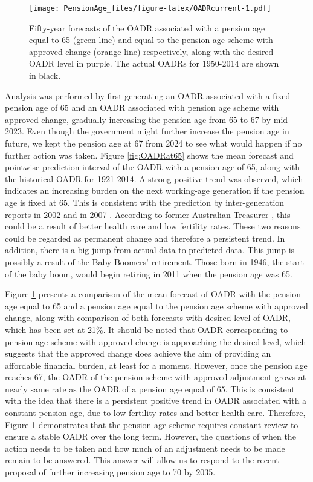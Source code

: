 \documentclass[11pt,a4paper,]{article}
\begin{document}
\begin{figure}
\centering
\texttt{[image: PensionAge\_files/figure-latex/OADRcurrent-1.pdf]}
\caption{\label{fig:OADRcurrent}Fifty-year forecasts of the OADR associated
with a pension age equal to 65 (green line) and equal to the pension age
scheme with approved change (orange line) respectively, along with the
desired OADR level in purple. The actual OADRs for 1950-2014 are shown
in black.}
\end{figure}

Analysis was performed by first generating an OADR associated with a
fixed pension age of 65 and an OADR associated with pension age scheme
with approved change, gradually increasing the pension age from 65 to 67
by mid-2023. Even though the government might further increase the
pension age in future, we kept the pension age at 67 from 2024 to see
what would happen if no further action was taken. Figure
\ref{fig:OADRat65} shows the mean forecast and pointwise prediction
interval of the OADR with a pension age of 65, along with the historical
OADR for 1921-2014. A strong positive trend was observed, which
indicates an increasing burden on the next working-age generation if the
pension age is fixed at 65. This is consistent with the prediction by
inter-generation reports in 2002 \autocite{IGR02} and in 2007
\autocite{IGR07}. According to former Australian Treasurer
\textcite{Costello04}, this could be a result of better health care and
low fertility rates. These two reasons could be regarded as permanent
change and therefore a persistent trend. In addition, there is a big
jump from actual data to predicted data. This jump is possibly a result
of the Baby Boomers' retirement. Those born in 1946, the start of the
baby boom, would begin retiring in 2011 when the pension age was 65.

Figure \ref{fig:OADRcurrent} presents a comparison of the mean forecast
of OADR with the pension age equal to 65 and a pension age equal to the
pension age scheme with approved change, along with comparison of both
forecasts with desired level of OADR, which has been set at 21\%. It
should be noted that OADR corresponding to pension age scheme with
approved change is approaching the desired level, which suggests that
the approved change does achieve the aim of providing an affordable
financial burden, at least for a moment. However, once the pension age
reaches 67, the OADR of the pension scheme with approved adjustment
grows at nearly same rate as the OADR of a pension age equal of 65. This
is consistent with the idea that there is a persistent positive trend in
OADR associated with a constant pension age, due to low fertility rates
and better health care. Therefore, Figure \ref{fig:OADRcurrent}
demonstrates that the pension age scheme requires constant review to
ensure a stable OADR over the long term. However, the questions of when
the action needs to be taken and how much of an adjustment needs to be
made remain to be answered. This answer will allow us to respond to the
recent proposal of further increasing pension age to 70 by 2035.
\end{document}
